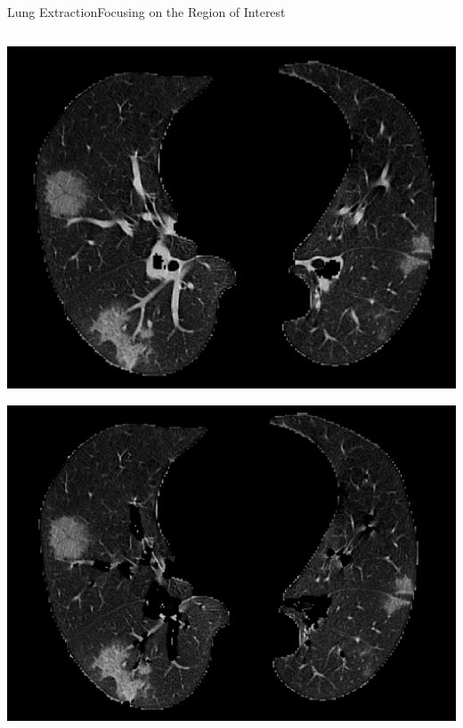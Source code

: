 \documentclass{standalone}
\begin{document}
\begin{frame}{Lung Extraction}{Focusing on the Region of Interest}
\begin{columns}
\begin{column}{0.5\textwidth}
				\centering\includegraphics[width=.8\linewidth]{./img/LUNG.png}
				
				\centering\includegraphics[width=.8\linewidth]{./img/BRREM.png}
				
			\end{column}
		\end{columns}
		
	\end{frame}
\end{document}
